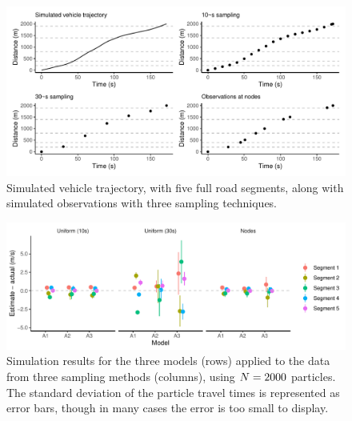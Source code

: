 \begin{knitrout}\small
{}\color{fgcolor}\begin{figure}
\includegraphics[width=\linewidth]{figure/sim1_graph-1} \caption[Simulated vehicle trajectory, with five full road segments, along with simulated observations with three sampling techniques]{Simulated vehicle trajectory, with five full road segments, along with simulated observations with three sampling techniques.}\label{fig:sim1_graph}
\end{figure}


\end{knitrout}

\begin{knitrout}\small
{}\color{fgcolor}\begin{figure}
\includegraphics[width=\linewidth]{figure/sim1_pf-1} \caption[Simulation results for the three models (rows) applied to the data from three sampling methods (columns), using $\Np=2000$ particles]{Simulation results for the three models (rows) applied to the data from three sampling methods (columns), using $\Np=2000$ particles. The standard deviation of the particle travel times is represented as error bars, though in many cases the error is too small to display.}\label{fig:sim1_pf}
\end{figure}


\end{knitrout}


